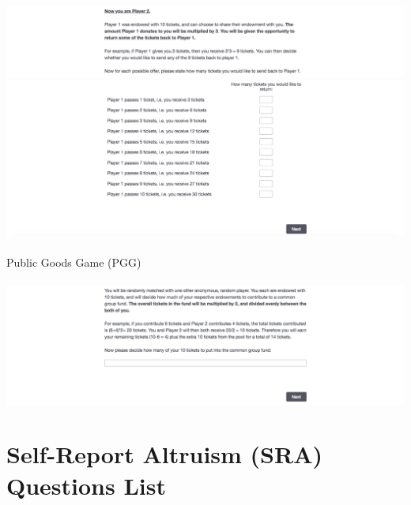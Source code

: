 \documentclass[12pt]{article}
\begin{document}
\includegraphics[scale=0.35]{trust2} \\
\includegraphics[scale=0.35]{trust3} \\ \\
\noindent Public Goods Game (PGG) \\ \\
\includegraphics[scale=0.35]{public} \\



\section{Self-Report Altruism (SRA) Questions List} \label{app:b}
\end{document}
